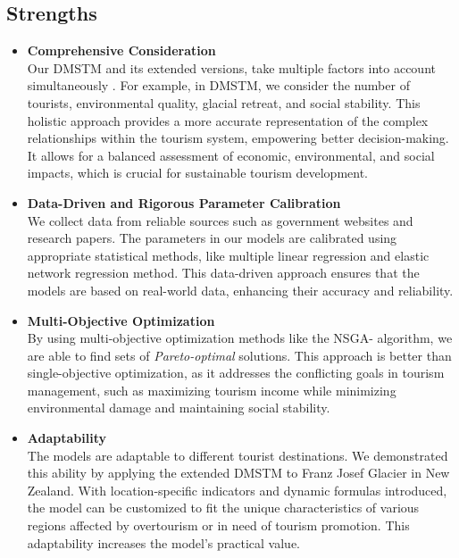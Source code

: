 \documentclass{mcmthesis}
\begin{document}
\subsection{Strengths}
\begin{itemize}
 \item \textbf{Comprehensive Consideration} \\
 Our DMSTM and its extended versions, take multiple factors into account simultaneously . 
 For example, in DMSTM, we consider the number of tourists, environmental quality, glacial retreat, and social stability. 
 This holistic approach provides a more accurate representation of the complex relationships within the tourism system, 
 empowering better decision-making. It allows for a balanced assessment of economic, environmental, and social impacts, 
 which is crucial for sustainable tourism development.
 \item \textbf{Data-Driven and Rigorous Parameter Calibration} \\
 We collect data from reliable sources such as government websites and research papers.
 The parameters in our models are calibrated using appropriate statistical methods, like multiple linear regression and elastic network regression method.
 This data-driven approach ensures that the models are based on real-world data, enhancing their accuracy and reliability.
 \item \textbf{Multi-Objective Optimization} \\
 By using multi-objective optimization methods like the NSGA-\uppercase\expandafter{} algorithm,
 we are able to find sets of \emph{Pareto-optimal} solutions. This approach is better than single-objective optimization, 
 as it addresses the conflicting goals in tourism management, such as maximizing tourism income while minimizing environmental damage and maintaining social stability.
 \item \textbf{Adaptability} \\
 The models are adaptable to different tourist destinations.
 We demonstrated this ability by applying the extended DMSTM to Franz Josef Glacier in New Zealand.
 With location-specific indicators and dynamic formulas introduced, the model can be customized to fit the unique characteristics of various regions affected by overtourism or in need of tourism promotion.
 This adaptability increases the model's practical value.
\end{itemize}
\end{document}
